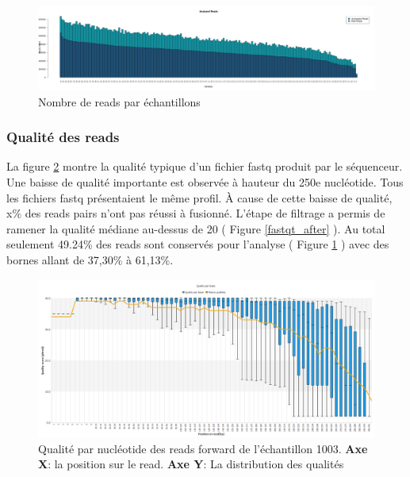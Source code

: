 \documentclass[12pt,a4paper]{article}
\begin{document}
\begin{figure}[ht]
\begin{center}
\includegraphics[scale=0.25]{img/pipeline.png}\hfill
\end{center}
\caption{Nombre de reads par échantillons}
\label{readcount}
\end{figure}


\subsubsection{Qualité des reads}
La figure \ref{fastqt} montre la qualité typique d'un fichier fastq produit par le séquenceur. Une baisse de qualité importante est observée à hauteur du 250e nucléotide. Tous les fichiers fastq présentaient le même profil. 
À cause de cette baisse de qualité, x\% des reads pairs n'ont pas réussi à fusionné. 
L'étape de filtrage a permis de ramener la qualité médiane au-dessus de 20 ( Figure \ref{fastqt_after} ).
Au total seulement 49.24\% des reads sont conservés pour l'analyse ( Figure \ref{readcount} ) avec des bornes allant de 37,30\% à 61,13\%.



\begin{figure}[ht]
\begin{center}
\includegraphics[scale=0.45]{img/1003_forward.png}\hfill
\end{center}
\caption{Qualité par nucléotide des reads forward de l'échantillon 1003. \textbf{Axe X}: la position sur le read. \textbf{Axe Y}: La distribution des qualités}
\label{fastqt}
\end{figure}
\end{document}

